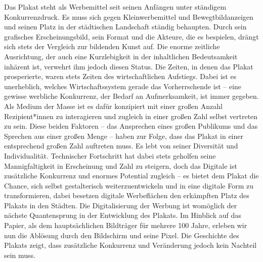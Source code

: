 \documentclass[a4paper,12pt,ngerman]{article}
\begin{document}
Das Plakat steht als Werbemittel seit seinen Anfängen unter ständigem Konkurrenzdruck. Es muss sich gegen Kleinwerbemittel und Bewegtbildanzeigen und seinen Platz in der städtischen Landschaft ständig behaupten. Durch sein grafisches Erscheinungsbild, sein Format und die Akteure, die es bespielen, drängt sich stets der Vergleich zur bildenden Kunst auf. Die enorme zeitliche Ausrichtung, der auch eine Kurzlebigkeit in der inhaltlichen Bedeutsamkeit inhärent ist, verwehrt ihm jedoch diesen Status. Die Zeiten, in denen das Plakat prosperierte, waren stets Zeiten des wirtschaftlichen Aufstiegs. Dabei ist es unerheblich, welches Wirtschaftssystem gerade das Vorherrschende ist -- eine gewisse werbliche Konkurrenz, der Bedarf an Aufmerksamkeit, ist immer gegeben. Als Medium der Masse ist es dafür konzipiert mit einer großen Anzahl Rezipient*innen zu interagieren und zugleich in einer großen Zahl selbst vertreten zu sein. Diese beiden Faktoren -- das Ansprechen eines großen Publikums und das Sprechen aus einer großen Menge -- haben zur Folge, dass das Plakat in einer entsprechend großen Zahl auftreten muss. Es lebt von seiner Diversität und Individualität. Technischer Fortschritt hat dabei stets geholfen seine Mannigfaltigkeit in Erscheinung und Zahl zu steigern, doch das Digitale ist zusätzliche Konkurrenz und enormes Potential zugleich -- es bietet dem Plakat die Chance, sich selbst gestalterisch weiterzuentwickeln und in eine digitale Form zu transformieren, dabei besetzen digitale Werbeflächen den erkämpften Platz des Plakats in den Städten. Die Digitalisierung der Werbung ist womöglich der nächste Quantensprung in der Entwicklung des Plakats. Im Hinblick auf das Papier, als dem hauptsächlichen Bildträger für mehrere 100 Jahre, erleben wir nun die Ablösung durch den Bildschirm und seine Pixel. Die Geschichte des Plakats zeigt, dass zusätzliche Konkurrenz und Veränderung jedoch kein Nachteil sein muss.

\newpage
\end{document}
